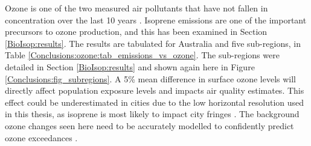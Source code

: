   Ozone is one of the two measured air pollutants that have not fallen in concentration over the last 10 years \parencite{SOE2016}.
  Isoprene emissions are one of the important precursors to ozone production, and this has been examined in Section \ref{BioIsop:results}.
  The results are tabulated for Australia and five sub-regions, in Table \ref{Conclusions:ozone:tab_emissions_vs_ozone}.
  The sub-regions were detailed in Section \ref{BioIsop:results} and shown again here in Figure \ref{Conclusions:fig_subregions}. 
  A 5\% mean difference in surface ozone levels will directly affect population exposure levels and impacts air quality estimates. 
  This effect could be underestimated in cities due to the low horizontal resolution used in this thesis, as isoprene is most likely to impact city fringes \parencite{Millet2016}.
  The background ozone changes seen here need to be accurately modelled to confidently predict ozone exceedances \parencite[e.g.,][]{Cope2004}.
  
